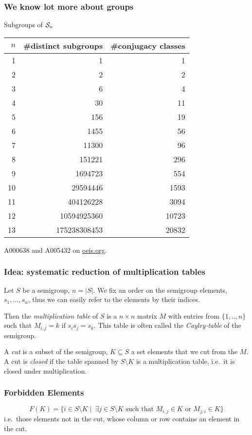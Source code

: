 \documentclass{beamer}
\newcommand{\cS}{{\cal S}}
\newcommand{\jump}{\vskip6pt}
\begin{document}
\begin{frame}\frametitle{We know lot more about groups}
Subgroups of $\cS_n$

\begin{tabular}{r|r|r}
$n$ & \#distinct subgroups & \#conjugacy classes\\
\hline
1& 1 & 1\\
2& 2&2\\
3& 6&4\\
4& 30&11\\
5& 156&19\\
6& 1455&56\\
7& 11300&96\\
8& 151221&296\\
9& 1694723&554\\
10& 29594446&1593\\
11& 404126228&3094\\
12& 10594925360&10723\\
13& 175238308453&20832
\end{tabular}

A000638 and A005432 on \url{oeis.org}.
\end{frame}

\begin{frame}\frametitle{Idea: systematic reduction of multiplication tables}
Let $S$ be a semigroup, $n=|S|$. We fix an order on the semigroup elements, $s_1,\ldots, s_n$, thus we can easily refer to the elements by their indices. 
\begin{definition}
Then the  \emph{multiplication table} of $S$ is a $n\times n$ matrix $M$ with entries from $\{1,..,n\}$ such that $M_{i,j}=k$ if $s_is_j=s_k$. This table is often called the \emph{Cayley-table} of the semigroup.
\end{definition}

\begin{definition}
A \emph{cut} is a subset of the semigroup, $K\subseteq S$ a set elements that we cut from the $M$.  A cut is \emph{closed} if the table spanned by $S\setminus K$ is a multiplication table, i.e.\ it is closed under multiplication.
\end{definition}
\end{frame}

\begin{frame}\frametitle{Forbidden Elements}

\begin{definition}
$$F(K)=\{i\in S\setminus K \mid\ \exists j\in S\setminus K \text{ such that } M_{i,j}\in K \text{ or } M_{j,i}\in K\} $$
\noindent i.e.\ those elements not in the cut, whose column or row contains an element in the cut.
\end{definition}

\end{frame}
\end{document}
